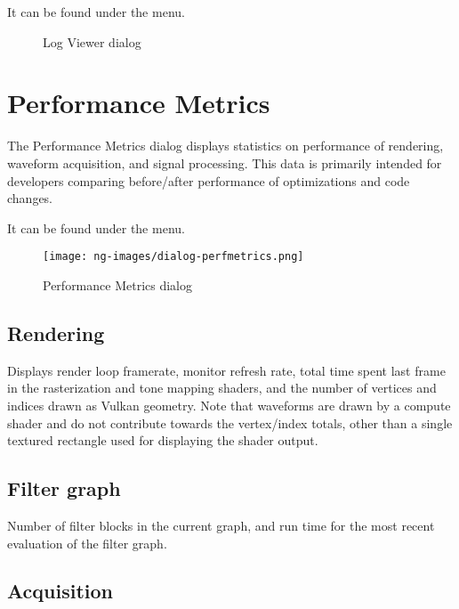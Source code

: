 It can be found under the  menu.

\begin{figure}[H]
\centering
{}
\caption{Log Viewer dialog}
\label{fig:logviewer}
\end{figure}


\section{Performance Metrics}
\label{dlg:perfmetrics}

The Performance Metrics dialog displays statistics on performance of rendering, waveform acquisition, and signal
processing. This data is primarily intended for developers comparing before/after performance of optimizations and code
changes.

It can be found under the  menu.

\begin{figure}[H]
\centering
\texttt{[image: ng-images/dialog-perfmetrics.png]}
\caption{Performance Metrics dialog}
\label{fig:perfmetrics}
\end{figure}

\subsection{Rendering}

Displays render loop framerate, monitor refresh rate, total time spent last frame in the rasterization and tone
mapping shaders, and the number of vertices and indices drawn as Vulkan geometry. Note that waveforms are drawn by a
compute shader and do not contribute towards the vertex/index totals, other than a single textured rectangle used for
displaying the shader output.

\subsection{Filter graph}
Number of filter blocks in the current graph, and run time for the most recent evaluation of the
filter graph.

\subsection{Acquisition}

